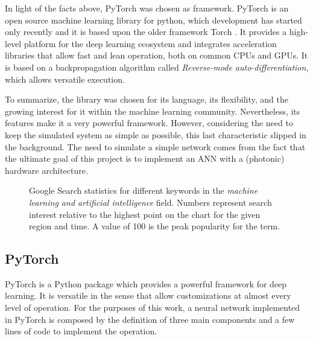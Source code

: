 In light of the facts above, PyTorch was chosen as framework.
PyTorch is an open source machine learning library for python, which development has started only recently and it is based upon the older framework Torch  \cite{PyTorch.org}.
It provides a high-level platform for the deep learning ecosystem and integrates acceleration libraries that allow fast and lean operation, both on common \acsp{CPU} and \acsp{GPU}.
It is based on a backpropagation algorithm called \textit{Reverse-mode auto-differentiation}, which allows versatile execution.

To summarize, the library was chosen for its language, its flexibility, and the growing interest for it within the machine learning community.
Nevertheless, its features make it a very powerful framework. However, considering the need to keep the simulated system as simple as possible, this last characteristic slipped in the background.
The need to simulate a simple network comes from the fact that the ultimate goal of this project is to implement an \acs{ANN} with a (photonic) hardware architecture.

\begin{figure}[htbp]
	\centering
	
	\caption{Google Search statistics for different keywords in the \textit{machine learning and artificial intelligence} field.
		Numbers represent search interest relative to the highest point on the chart for the given region and time.
		A value of 100 is the peak popularity for the term.}
	\label{fig:GoogleTrendsPyTorch}
\end{figure}


\subsection{PyTorch}
\label{ssec:PyTorch}
PyTorch is a Python package which provides a powerful framework for deep learning.
It is versatile in the sense that allow customizations at almost every level of operation.
For the purposes of this work, a neural network implemented in PyTorch is composed by the definition of three main components and a few lines of code to implement the operation.


